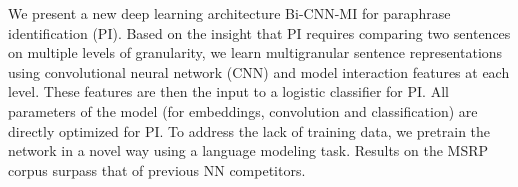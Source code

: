 We present a new deep learning architecture Bi-CNN-MI for paraphrase identification (PI). Based on the insight that PI requires comparing two sentences on multiple levels of granularity, we learn multigranular sentence representations using convolutional neural network (CNN) and model interaction features at each level. These features are then the input to a logistic classifier for PI. All parameters of the model (for embeddings, convolution and classification) are directly optimized for PI. To address the lack of training data, we pretrain the network in a novel way using a language modeling task. Results on the MSRP corpus surpass that of previous NN competitors.
